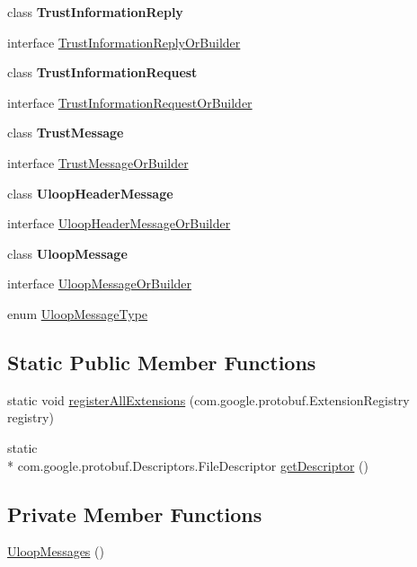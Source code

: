 \begin{DoxyCompactItemize}
class {\bfseries Trust\+Information\+Reply}
\item 
interface \hyperlink{interfaceeu_1_1uloop_1_1messages_1_1UloopMessages_1_1TrustInformationReplyOrBuilder}{Trust\+Information\+Reply\+Or\+Builder}
\item 
class {\bfseries Trust\+Information\+Request}
\item 
interface \hyperlink{interfaceeu_1_1uloop_1_1messages_1_1UloopMessages_1_1TrustInformationRequestOrBuilder}{Trust\+Information\+Request\+Or\+Builder}
\item 
class {\bfseries Trust\+Message}
\item 
interface \hyperlink{interfaceeu_1_1uloop_1_1messages_1_1UloopMessages_1_1TrustMessageOrBuilder}{Trust\+Message\+Or\+Builder}
\item 
class {\bfseries Uloop\+Header\+Message}
\item 
interface \hyperlink{interfaceeu_1_1uloop_1_1messages_1_1UloopMessages_1_1UloopHeaderMessageOrBuilder}{Uloop\+Header\+Message\+Or\+Builder}
\item 
class {\bfseries Uloop\+Message}
\item 
interface \hyperlink{interfaceeu_1_1uloop_1_1messages_1_1UloopMessages_1_1UloopMessageOrBuilder}{Uloop\+Message\+Or\+Builder}
\item 
enum \hyperlink{enumeu_1_1uloop_1_1messages_1_1UloopMessages_1_1UloopMessageType}{Uloop\+Message\+Type}
\end{DoxyCompactItemize}
\subsection*{Static Public Member Functions}
\begin{DoxyCompactItemize}
\item 
static void \hyperlink{classeu_1_1uloop_1_1messages_1_1UloopMessages_ae0d6da89089f061c824359536d2bf306}{register\+All\+Extensions} (com.\+google.\+protobuf.\+Extension\+Registry registry)
\item 
static \\*
com.\+google.\+protobuf.\+Descriptors.\+File\+Descriptor \hyperlink{classeu_1_1uloop_1_1messages_1_1UloopMessages_a85f9353364f660f87e8add6b72f2764d}{get\+Descriptor} ()
\end{DoxyCompactItemize}
\subsection*{Private Member Functions}
\begin{DoxyCompactItemize}
\item 
\hyperlink{classeu_1_1uloop_1_1messages_1_1UloopMessages_a76633ecab518a92765e1cda2be7ac933}{Uloop\+Messages} ()
\end{DoxyCompactItemize}
